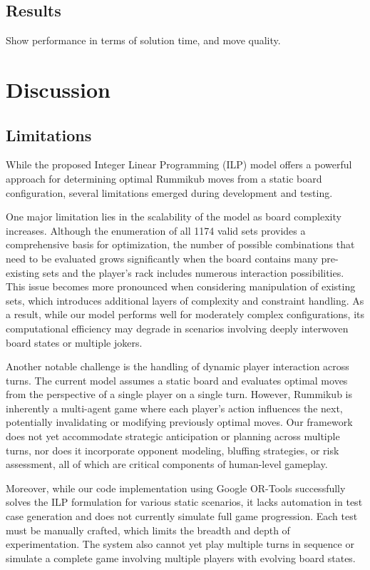 \documentclass[11pt,letterpaper]{article}
\begin{document}
\subsection*{Results}
Show performance in terms of solution time, and move quality.

\section*{Discussion}

\subsection*{Limitations}

While the proposed Integer Linear Programming (ILP) model offers a powerful approach for determining optimal Rummikub moves from a static board configuration, several limitations emerged during development and testing.

One major limitation lies in the scalability of the model as board complexity increases. Although the enumeration of all 1174 valid sets provides a comprehensive basis for optimization, the number of possible combinations that need to be evaluated grows significantly when the board contains many pre-existing sets and the player’s rack includes numerous interaction possibilities. This issue becomes more pronounced when considering manipulation of existing sets, which introduces additional layers of complexity and constraint handling. As a result, while our model performs well for moderately complex configurations, its computational efficiency may degrade in scenarios involving deeply interwoven board states or multiple jokers.

Another notable challenge is the handling of dynamic player interaction across turns. The current model assumes a static board and evaluates optimal moves from the perspective of a single player on a single turn. However, Rummikub is inherently a multi-agent game where each player’s action influences the next, potentially invalidating or modifying previously optimal moves. Our framework does not yet accommodate strategic anticipation or planning across multiple turns, nor does it incorporate opponent modeling, bluffing strategies, or risk assessment, all of which are critical components of human-level gameplay.

Moreover, while our code implementation using Google OR-Tools successfully solves the ILP formulation for various static scenarios, it lacks automation in test case generation and does not currently simulate full game progression. Each test must be manually crafted, which limits the breadth and depth of experimentation. The system also cannot yet play multiple turns in sequence or simulate a complete game involving multiple players with evolving board states.
\end{document}

